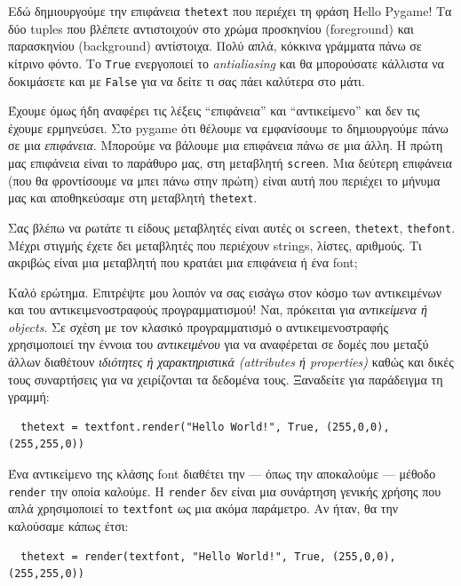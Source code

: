 Εδώ δημιουργούμε την επιφάνεια {\tt thetext} που περιέχει τη φράση Hello Pygame! Τα δύο tuples που βλέπετε αντιστοιχούν στο χρώμα προσκηνίου (foreground) και παρασκηνίου (background) αντίστοιχα. Πολύ απλά, κόκκινα γράμματα πάνω σε κίτρινο φόντο. Το {\tt True} ενεργοποιεί το {\em antialiasing} και θα μπορούσατε κάλλιστα να δοκιμάσετε και με {\tt False} για να δείτε τι σας πάει καλύτερα στο μάτι.

Έχουμε όμως ήδη αναφέρει τις λέξεις ``επιφάνεια'' και ``αντικείμενο'' και δεν τις έχουμε ερμηνεύσει. Στο pygame ότι θέλουμε να εμφανίσουμε το δημιουργούμε πάνω σε μια {\em επιφάνεια}. Μπορούμε να βάλουμε μια επιφάνεια πάνω σε μια άλλη. Η πρώτη μας επιφάνεια είναι το παράθυρο μας, στη μεταβλητή {\tt screen}. Μια δεύτερη επιφάνεια (που θα φροντίσουμε να μπει πάνω στην πρώτη) είναι αυτή που περιέχει το μήνυμα μας και αποθηκεύσαμε στη μεταβλητή {\tt thetext}.

Σας βλέπω να ρωτάτε τι είδους μεταβλητές είναι αυτές οι {\tt screen}, {\tt thetext}, {\tt thefont}. Μέχρι στιγμής έχετε δει μεταβλητές που περιέχουν strings, λίστες, αριθμούς. Τι ακριβώς είναι μια μεταβλητή που κρατάει μια επιφάνεια ή ένα font;

Καλό ερώτημα. Επιτρέψτε μου λοιπόν να σας εισάγω στον κόσμο των αντικειμένων και του αντικειμενοστραφούς προγραμματισμού! Ναι, πρόκειται για {\em αντικείμενα ή objects}. Σε σχέση με τον κλασικό προγραμματισμό ο αντικειμενοστραφής χρησιμοποιεί την έννοια του {\em αντικειμένου} για να αναφέρεται σε δομές που μεταξύ άλλων διαθέτουν {\em ιδιότητες ή χαρακτηριστικά (attributes ή properties)} καθώς και δικές τους συναρτήσεις για να χειρίζονται τα δεδομένα τους. Ξαναδείτε για παράδειγμα τη γραμμή:

\begin{verbatim}
  thetext = textfont.render("Hello World!", True, (255,0,0),(255,255,0))
\end{verbatim}

Ένα αντικείμενο της κλάσης font διαθέτει την --- όπως την αποκαλούμε --- μέθοδο {\tt render} την οποία καλούμε. H {\tt render} δεν είναι μια συνάρτηση γενικής χρήσης που απλά χρησιμοποιεί το {\tt textfont} ως μια ακόμα παράμετρο. Αν ήταν, θα την καλούσαμε  κάπως έτσι:

\begin{verbatim}
  thetext = render(textfont, "Hello World!", True, (255,0,0),(255,255,0))
\end{verbatim}

